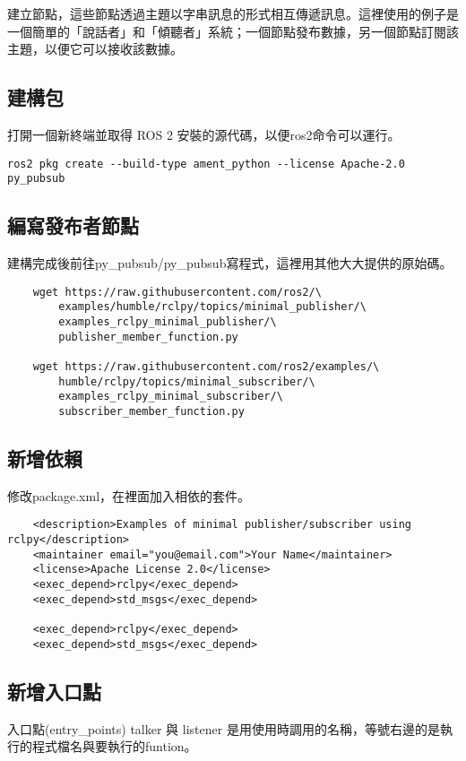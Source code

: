 建立節點，這些節點透過主題以字串訊息的形式相互傳遞訊息。這裡使用的例子是一個簡單的「說話者」和「傾聽者」系統；一個節點發布數據，另一個節點訂閱該主題，以便它可以接收該數據。

\subsection{建構包}
打開一個新終端並取得 ROS 2 安裝的源代碼，以便ros2命令可以運行。

\begin{verbatim}
ros2 pkg create --build-type ament_python --license Apache-2.0 py_pubsub
\end{verbatim}

\subsection{編寫發布者節點}
建構完成後前往py\_pubsub/py\_pubsub寫程式，這裡用其他大大提供的原始碼。

\begin{verbatim}
    wget https://raw.githubusercontent.com/ros2/\ 
        examples/humble/rclpy/topics/minimal_publisher/\ 
        examples_rclpy_minimal_publisher/\ 
        publisher_member_function.py

    wget https://raw.githubusercontent.com/ros2/examples/\ 
        humble/rclpy/topics/minimal_subscriber/\ 
        examples_rclpy_minimal_subscriber/\ 
        subscriber_member_function.py
\end{verbatim}

\subsection{新增依賴}
修改package.xml，在裡面加入相依的套件。

\begin{verbatim}
    <description>Examples of minimal publisher/subscriber using rclpy</description>
    <maintainer email="you@email.com">Your Name</maintainer>
    <license>Apache License 2.0</license>
    <exec_depend>rclpy</exec_depend>
    <exec_depend>std_msgs</exec_depend>

    <exec_depend>rclpy</exec_depend>
    <exec_depend>std_msgs</exec_depend>
\end{verbatim}

\subsection{新增入口點}
入口點(entry\_points) talker 與 listener 是用使用時調用的名稱，等號右邊的是執行的程式檔名與要執行的funtion。

